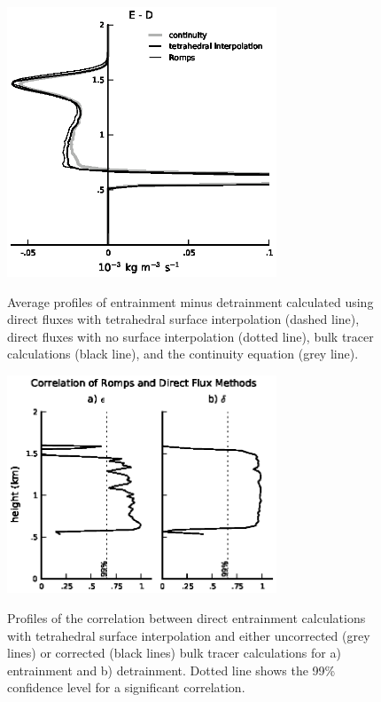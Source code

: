 \documentclass[12pt]{article}
\begin{document}
\begin{figure}[t]
  \noindent\includegraphics[width=19pc,angle=0]{./figures/E_minus_D}\\
  \caption{Average profiles of entrainment minus detrainment calculated using 
direct fluxes with tetrahedral surface interpolation (dashed line), direct 
fluxes with no surface interpolation (dotted line), bulk tracer calculations 
(black line), and the continuity equation (grey line).}\label{fig:E_minus_D}
\end{figure}

\begin{figure}[t]
  \noindent\includegraphics[width=19pc,angle=0]{./figures/correlations}\\
  \caption{Profiles of the correlation between direct entrainment calculations
with tetrahedral surface interpolation and either uncorrected (grey lines) or 
corrected (black lines) bulk tracer calculations for a) entrainment and b) 
detrainment.  Dotted line shows the 99\% confidence level for a significant 
correlation.}\label{fig:correlations}
\end{figure}
\end{document}
